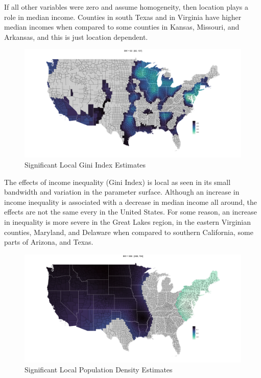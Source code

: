 \documentclass[
]{article}
\begin{document}
If all other variables were zero and assume homogeneity, then location
plays a role in median income. Counties in south Texas and in Virginia
have higher median incomes when compared to some counties in Kansas,
Missouri, and Arkansas, and this is just location dependent.

\begin{figure}[H]

{\centering \includegraphics[width=1\linewidth]{images/local-param/sig-gini} 

}

\caption{Significant Local Gini Index Estimates}\label{fig:unnamed-chunk-13}
\end{figure}

The effects of income inequality (Gini Index) is local as seen in its
small bandwidth and variation in the parameter surface. Although an
increase in income inequality is associated with a decrease in median
income all around, the effects are not the same every in the United
States. For some reason, an increase in inequality is more severe in the
Great Lakes region, in the eastern Virginian counties, Maryland, and
Delaware when compared to southern California, some parts of Arizona,
and Texas.

\begin{figure}[H]

{\centering \includegraphics[width=1\linewidth]{images/local-param/sig-ln-pop-den} 

}

\caption{Significant Local Population Density Estimates}\label{fig:unnamed-chunk-14}
\end{figure}
\end{document}
